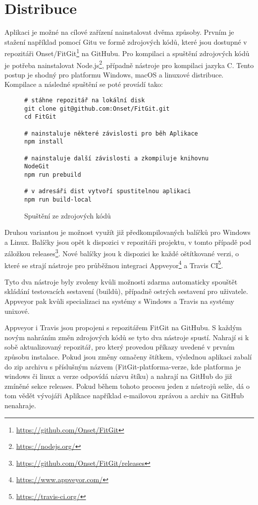 \chapter{Distribuce}

Aplikaci je možné na cílové zařízení nainstalovat dvěma způsoby. Prvním je stažení například pomocí Gitu ve formě zdrojových kódů, které jsou dostupné v repozitáři Onset/FitGit\footnote{\url{https://github.com/Onset/FitGit}} na GitHubu. Pro kompilaci a spuštění zdrojových kódů je potřeba nainstalovat Node.js\footnote{\url{https://nodejs.org/}}, případně nástroje pro kompilaci jazyka C. Tento postup je shodný pro platformu Windows, macOS a linuxové distribuce. Kompilace a následné spuštění se poté provádí tako:

\FloatBarrier
\begin{figure}[h]
	\begin{verbatim}
# stáhne repozitář na lokální disk
git clone git@github.com:Onset/FitGit.git
cd FitGit

# nainstaluje některé závislosti pro běh Aplikace
npm install

# nainstaluje další závislosti a zkompiluje knihovnu NodeGit
npm run prebuild

# v adresáři dist vytvoří spustitelnou aplikaci
npm run build-local
	\end{verbatim}
	\caption{Spuštění ze zdrojových kódů}
\end{figure}
\FloatBarrier

Druhou variantou je možnost využít již předkompilovaných balíčků pro Windows a Linux. Balíčky jsou opět k dispozici v repozitáři projektu, v tomto případě pod záložkou releases\footnote{\url{https://github.com/Onset/FitGit/releases}}. Nové balíčky jsou k dispozici ke každé oštítkované verzi, o které se strají nástroje pro průběžnou integraci Appveyor\footnote{\url{https://www.appveyor.com/}} a Travis CI\footnote{\url{https://travis-ci.org/}}.

Tyto dva nástroje byly zvoleny kvůli možnosti zdarma automaticky spouštět skládání testovacích sestavení (buildů), případně ostrých sestavení pro uživatele. Appveyor pak kvůli specializaci na systémy s Windows a Travis na systémy unixové.

Appveyor i Travis jsou propojeni s repozitářem FitGit na GitHubu. S každým novým nahráním změn zdrojových kódů se tyto dva nástroje spustí. Nahrají si k sobě aktualizovaný repozitář, pro který provedou příkazy uvedené v prvním způsobu instalace. Pokud jsou změny označeny štítkem, výslednou aplikaci zabalí do zip archivu s příslušným názvem (FitGit-platforma-verze, kde platforma je windows či linux a verze odpovídá názvu štíku) a nahrají na GitHub do již zmíněné sekce releases. Pokud během tohoto procesu jeden z nástrojů selže, dá o tom vědět vývojáři Aplikace například e-mailovou zprávou a archiv na GitHub nenahraje.

